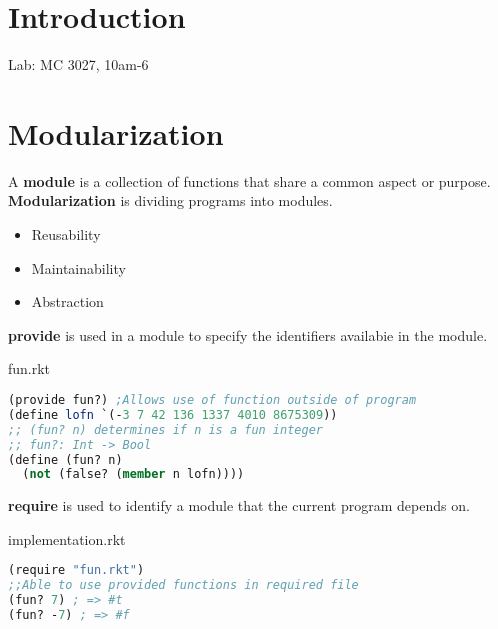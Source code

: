 \documentclass[english, 12pt]{article}
\begin{document}
\notesheader
\section{Introduction}
Lab: MC 3027, 10am-6

\section{Modularization}
\begin{defn}
A \textbf{module} is a collection of functions that share a common aspect or purpose. \textbf{Modularization} is dividing programs into modules.
\begin{itemize}
\item Reusability
\item Maintainability
\item Abstraction
\end{itemize}
\end{defn}
\begin{defn}
\textbf{provide} is used in a module to specify the identifiers availabie in the module.
\end{defn}
fun.rkt
\begin{lstlisting}[language=Scheme]
(provide fun?) ;Allows use of function outside of program
(define lofn `(-3 7 42 136 1337 4010 8675309))
;; (fun? n) determines if n is a fun integer
;; fun?: Int -> Bool
(define (fun? n)
  (not (false? (member n lofn))))
\end{lstlisting}
\begin{defn}
\textbf{require} is used to identify a module that the current program depends on.
\end{defn}
implementation.rkt
\begin{lstlisting}[language=Scheme]
(require "fun.rkt")
;;Able to use provided functions in required file
(fun? 7) ; => #t
(fun? -7) ; => #f
\end{lstlisting}
\end{document}

